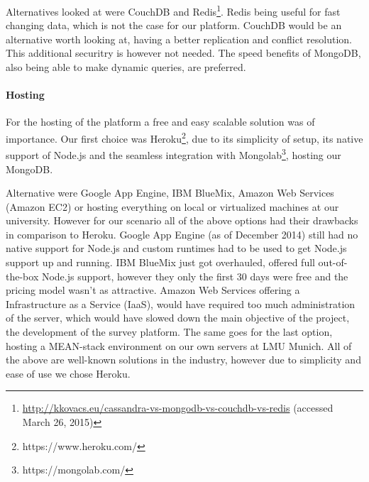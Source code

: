 


		Alternatives looked at were CouchDB and Redis\footnote{\url{http://kkovacs.eu/cassandra-vs-mongodb-vs-couchdb-vs-redis} (accessed March 26, 2015)}. Redis being useful for fast changing data, which is not the case for our platform. CouchDB would be an alternative worth looking at, having a better replication and conflict resolution. This additional securitry is however not needed. The speed benefits of MongoDB, also being able to make dynamic queries, are preferred.



	\paragraph{Hosting}

		For the hosting of the platform a free and easy scalable solution was of importance. Our first choice was Heroku\footnote{https://www.heroku.com/}, due to its simplicity of setup, its native support of Node.js and the seamless integration with Mongolab\footnote{https://mongolab.com/}, hosting our MongoDB.





		Alternative were Google App Engine, IBM BlueMix, Amazon Web Services (Amazon EC2) or hosting everything on local or virtualized machines at our university. However for our scenario all of the above options had their drawbacks in comparison to Heroku. Google App Engine (as of December 2014) still had no native support for Node.js and custom runtimes had to be used to get Node.js support up and running. IBM BlueMix just got overhauled, offered full out-of-the-box Node.js support, however they only the first 30 days were free and the pricing model wasn't as attractive. Amazon Web Services offering a Infrastructure as a Service (IaaS), would have required too much administration of the server, which would have slowed down the main objective of the project, the development of the survey platform. The same goes for the last option, hosting a MEAN-stack environment on our own servers at LMU Munich. All of the above are well-known solutions in the industry, however due to simplicity and ease of use we chose Heroku.




